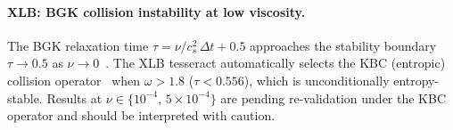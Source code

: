 \documentclass{article}
\begin{document}
\paragraph{XLB: BGK collision instability at low viscosity.}
The BGK relaxation time $\tau = \nu/c_s^2\,\Delta t + 0.5$ approaches the
stability boundary $\tau \to 0.5$ as $\nu \to 0$~\cite{qian1992lattice}.
The XLB tesseract automatically selects the KBC (entropic) collision
operator~\cite{ataei2024xlb} when $\omega > 1.8$ ($\tau < 0.556$), which is
unconditionally entropy-stable.
Results at $\nu \in \{10^{-4},\, 5\times10^{-4}\}$ are pending re-validation
under the KBC operator and should be interpreted with caution.


\newpage

\end{document}
